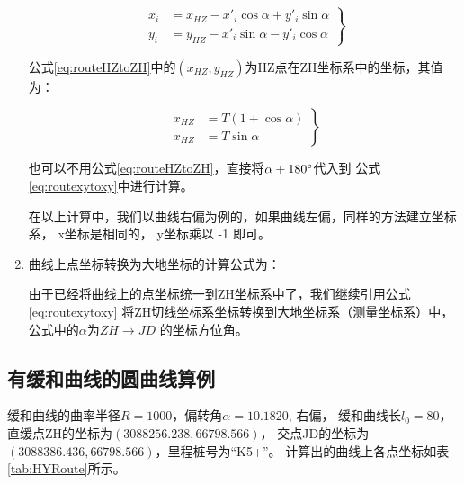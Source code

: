 \begin{enumerate}
\begin{equation}
\left . \begin{aligned}
x_i &= x_{HZ} - x'_i  \cos \alpha + y'_i \sin \alpha \\
y_i &= y_{HZ}  -  x'_i \sin \alpha -  y'_i \cos \alpha
\end{aligned} \right \}
\label{eq:routeHZtoZH}
\end{equation}

公式\ref{eq:routeHZtoZH}中的$(x_{HZ}, y_{HZ})$为HZ点在ZH坐标系中的坐标，其值为：

\begin{equation}
\left .
\begin{aligned}
x_{HZ} &= T (1 +  \cos \alpha) \\
x_{HZ} &=  T \sin \alpha
\end{aligned}
\right \}
\label{eq:routeHZXY}
\end{equation}

也可以不用公式\ref{eq:routeHZtoZH}，直接将$\alpha+180^\circ$代入到
公式\ref{eq:routexytoxy}中进行计算。

在以上计算中，我们以曲线右偏为例的，如果曲线左偏，同样的方法建立坐标系，
x坐标是相同的， y坐标乘以 -1 即可。

\item 曲线上点坐标转换为大地坐标的计算公式为：

由于已经将曲线上的点坐标统一到ZH坐标系中了，我们继续引用公式\ref{eq:routexytoxy}
将ZH切线坐标系坐标转换到大地坐标系（测量坐标系）中，公式中的$\alpha$为$ZH \rightarrow JD$
的坐标方位角。

\end{enumerate}


\subsection{有缓和曲线的圆曲线算例}

缓和曲线的曲率半径$R=1000$，偏转角$\alpha =10.1820$, 右偏，
缓和曲线长$l_0=80$，直缓点ZH的坐标为$(3088256.238, 66798.566)$，
交点JD的坐标为$(3088386.436, 66798.566)$，里程桩号为``K5+''。
计算出的曲线上各点坐标如表\ref{tab:HYRoute}所示。

